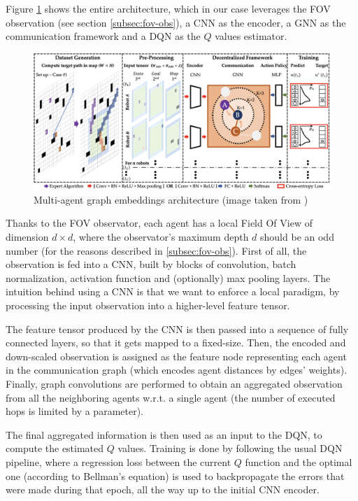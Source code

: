\documentclass[a4paper,10pt]{report}
\begin{document}
Figure \ref{fig:dqn-gnn-robot} shows the entire architecture, which in our case leverages the FOV observation (see section \ref{subsec:fov-obs}), a CNN as the encoder, a GNN as the communication framework and a DQN as the $Q$ values estimator.  

\begin{figure}[h]
	\includegraphics[width=\textwidth]{dqn-gnn-robot.png}
	\caption{Multi-agent graph embeddings architecture (image taken from \cite{dqn-gnn-robot})}
	\label{fig:dqn-gnn-robot}
\end{figure}

Thanks to the FOV observator, each agent has a local Field Of View of dimension $d\times d$, where the observator's maximum depth $d$ should be an odd number (for the reasons described in \ref{subsec:fov-obs}). First of all, the observation is fed into a CNN, built by blocks of convolution, batch normalization, activation function and (optionally) max pooling layers. The intuition behind using a CNN is that we want to enforce a local paradigm, by processing the input observation into a higher-level feature tensor.

The feature tensor produced by the CNN is then passed into a sequence of fully connected layers, so that it gets mapped to a fixed-size. Then, the encoded and down-scaled observation is assigned as the feature node representing each agent in the communication graph (which encodes agent distances by edges' weights). Finally, graph convolutions are performed to obtain an aggregated observation from all the neighboring agents w.r.t. a single agent (the number of executed hops is limited by a parameter).

The final aggregated information is then used as an input to the DQN, to compute the estimated $Q$ values. Training is done by following the usual DQN pipeline, where a regression loss between the current $Q$ function and the optimal one (according to Bellman's equation) is used to backpropagate the errors that were made during that epoch, all the way up to the initial CNN encoder.
\end{document}

